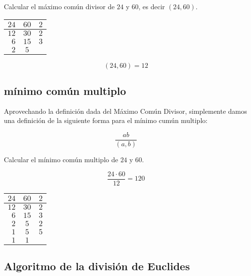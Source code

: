         \begin{ejemplo}
            Calcular el máximo común divisor de $24$ y $60$, es decir $(24, 60)$.

            \begin{center}
                    \begin{tabular}{r c | l}
                    $24$ & $60$ & $2$ \\
                    \hline
                    $12$ & $30$ & $2$ \\
                    $6$ & $15$ & $3$ \\
                    $2$ & $5$ & 
                \end{tabular}
            \end{center}

            \begin{equation*}
                (24, 60) = 12
            \end{equation*}
        \end{ejemplo}


    \subsection{mínimo común multiplo}

        \begin{definicion}
            Aprovechando la definición dada del Máximo Común Divisor, simplemente damos una definición de la siguiente forma para el mínimo cumún multiplo:

            \begin{equation}
                \frac{ab}{(a, b)}
            \end{equation}
        \end{definicion}

        \begin{ejemplo}
            Calcular el mínimo común multiplo de $24$ y $60$.

            \begin{equation*}
                \frac{24 \cdot 60}{12} = 120
            \end{equation*}

            \begin{center}
                    \begin{tabular}{r c | l}
                    $24$ & $60$ & $2$ \\
                    \hline
                    $12$ & $30$ & $2$ \\
                    $6$ & $15$ & $3$ \\
                    $2$ & $5$ & $2$ \\
                    $1$ & $5$ & $5$ \\
                    $1$ & $1$ & 
                \end{tabular}
            \end{center}
        \end{ejemplo}


    \subsection{Algoritmo de la división de Euclides}

